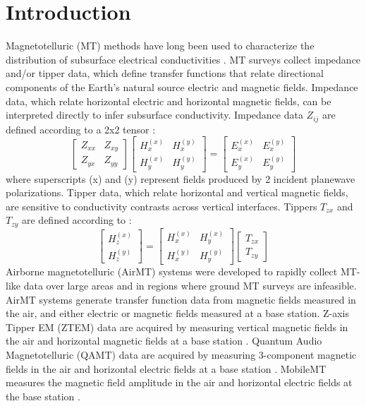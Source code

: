 \documentclass{segabs}
\begin{document}
\section{Introduction}
\vspace{-5pt}
Magnetotelluric (MT) methods have long been used to characterize the distribution of subsurface electrical conductivities \citep{Tikhonov1950, Cagniard1953, Ward1959, Vozoff1972}. MT surveys collect impedance and/or tipper data, which define transfer functions that relate directional components of the Earth's natural source electric and magnetic fields. Impedance data, which relate horizontal electric and horizontal magnetic fields, can be interpreted directly to infer subsurface conductivity. Impedance data $Z_{ij}$ are defined according to a 2x2 tensor \citep{ChaveJones2012}:
\begin{equation}
\label{eq:impedance_definition}
\begin{bmatrix} Z_{xx} & Z_{xy} \\ Z_{yx} & Z_{yy} \end{bmatrix}
\begin{bmatrix} H_x^{(x)} & H_x^{(y)} \\ H_y^{(x)} & H_y^{(y)} \end{bmatrix} =
\begin{bmatrix} E_x^{(x)} & E_x^{(y)} \\ E_y^{(x)} & E_y^{(y)} \end{bmatrix}
\end{equation}
where superscripts (x) and (y) represent fields produced by 2 incident planewave polarizations. Tipper data, which relate horizontal and vertical magnetic fields, are sensitive to conductivity contrasts across vertical interfaces. Tippers $T_{zx}$ and $T_{zy}$ are defined according to \citep{ChaveJones2012}:
\begin{equation}
\label{eq:tipper_definition}
\begin{bmatrix} H_z^{(x)} \\ H_z^{(y)} \end{bmatrix} =
\begin{bmatrix} H_x^{(x)} & H_y^{(x)} \\ H_x^{(y)} & H_y^{(y)} \end{bmatrix}
\begin{bmatrix} T_{zx} \\ T_{zy} \end{bmatrix}
\end{equation}
Airborne magnetotelluric (AirMT) systems were developed to rapidly collect MT-like data over large areas and in regions where ground MT surveys are infeasible. AirMT systems generate transfer function data from magnetic fields measured in the air, and either electric or magnetic fields measured at a base station. Z-axis Tipper EM (ZTEM) data are acquired by measuring vertical magnetic fields in the air and horizontal magnetic fields at a base station \citep{LoZang2008}. Quantum Audio Magnetotelluric (QAMT) data are acquired by measuring 3-component magnetic fields in the air and horizontal electric fields at a base station \citep{Larnier2021}. MobileMT measures the magnetic field amplitude in the air and horizontal electric fields at the base station \citep{Sattel2019}.
\end{document}

